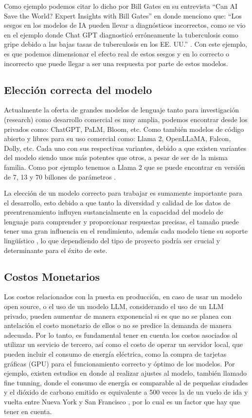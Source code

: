 Como ejemplo podemos citar lo dicho por Bill Gates en su entrevista ``Can AI Save the World? Expert Insights with Bill Gates'' en donde menciono que: 
``Los sesgos en los modelos de IA pueden llevar a diagnósticos incorrectos, como se vio en el ejemplo donde Chat GPT diagnosticó erróneamente la 
tuberculosis como gripe debido a las bajas tasas de tuberculosis en los EE. UU.'' \cite{billgates1}. Con este ejemplo, es que podemos dimensionar el efecto real de estos sesgos y
en lo correcto o incorrecto que puede llegar a ser una respuesta por parte de estos modelos.

\subsection{Elección correcta del modelo}

Actualmente la oferta de grandes modelos de lenguaje tanto para investigación (research) como desarrollo comercial es muy amplia, podemos encontrar desde los privados como: ChatGPT, PaLM, Bloom, etc. 
Como también modelos de código abierto y libres para su uso comercial como: Llama 2, OpenLLaMA, Falcon, Dolly, etc. \cite{modelos2} Cada uno con sus respectivas variantes, debido a que existen 
variantes del modelo siendo unos más potentes que otros, a pesar de ser de la misma familia. Como por ejemplo tenemos a Llama 2 que se puede encontrar en versión de 7, 13 y 70 billones de parámetros \cite{modelos3}. 

La elección de un modelo correcto para trabajar es sumamente importante para el desarrollo, esto debido a que tanto la diversidad y calidad de los datos de preentrenamiento influyen 
sustancialmente en la capacidad del modelo de lenguaje para comprender y proporcionar respuestas precisas, el tamaño puede tener una 
gran influencia en el rendimiento, además cada modelo tiene su soporte lingüístico \cite{modelos1}, lo que dependiendo del tipo de proyecto podría ser crucial y determinante para el éxito de este.  


\subsection{Costos Monetarios}
Los costos relacionados con la puesta en producción, en caso de usar un modelo open source, o el uso de un modelo LLM, considerando el uso de un LLM privado, pueden aumentar de manera exponencial si es que no se planea con antelación el costo monetario de ellos o no se predice la demanda de manera adecuada. Por lo tanto, es fundamental tener en 
cuenta los costos asociados al utilizar un servicio de tercero, así como el costo de operar un servidor local, que pueden incluir el consumo de energía eléctrica, como la compra de tarjetas gráficas (GPU) para el funcionamiento correcto y óptimo de los modelos.
Por ejemplo, existen estudios en donde al realizar ajustes al modelo, también llamado fine tunning, donde el consumo de energía es comparable al de pequeñas ciudades y el dióxido 
de carbono emitido es equivalente a 500 veces la de un vuelo de ida y vuelta entre Nueva York y San Francisco \cite{ft1}, por lo cual es un factor que hay que tener en cuenta. 


